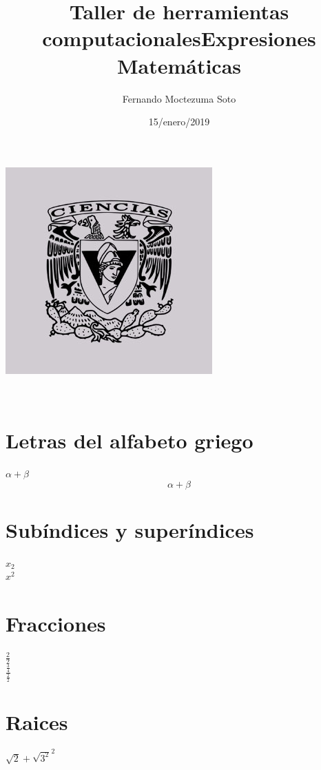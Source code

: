 \documentclass[letterpaper,12pt,oneside]{article}
\title{\Huge Taller de herramientas computacionales}
\author{Fernando Moctezuma Soto}
\date{15/enero/2019}
\begin{document}
	\maketitle
	
	\begin{center}
		\includegraphics[scale=0.40]{1.jpg}
	\end{center}

	\newpage
	
	\title{\Huge\textbf{Expresiones Matemáticas}}\\
	\section*{Letras del alfabeto griego}
	$\alpha + \beta$
	\[\alpha + \beta\]

	\section*{Subíndices y superíndices}
	$x_{2}$\\
	$x^{2}$

	\section*{Fracciones}
	$\frac{2}{2}$\\
	$\frac{\frac{3}{4}}{\frac{2}{2}}$\\
	
	\section*{Raices}
	$\sqrt{2} + \sqrt{3^2}^2$\\
	
\end{document}
